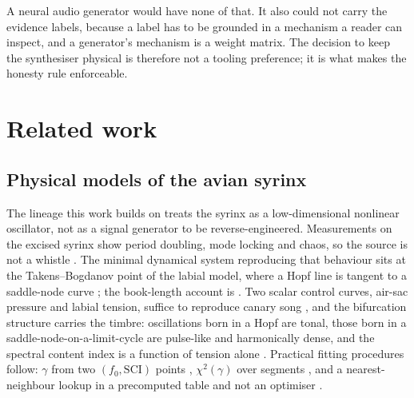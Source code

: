 \documentclass[10pt,twocolumn,a4paper]{article}
\begin{document}
A neural audio generator would have none of that. It also could not carry the evidence
labels, because a label has to be grounded in a mechanism a reader can inspect, and a
generator's mechanism is a weight matrix. The decision to keep the synthesiser physical is
therefore not a tooling preference; it is what makes the honesty rule enforceable.

\section{Related work}
\label{sec:prior}

\subsection{Physical models of the avian syrinx}

The lineage this work builds on treats the syrinx as a low-dimensional nonlinear
oscillator, not as a signal generator to be reverse-engineered. Measurements on the
excised syrinx show period doubling, mode locking and chaos, so the source is not a
whistle \citep{fee1998}. The minimal dynamical system reproducing that behaviour sits at
the Takens--Bogdanov point of the labial model, where a Hopf line is tangent to a
saddle-node curve \citep{laje2002a,laje2002b}; the book-length account is
\citet{mindlin2005}. Two scalar control curves, air-sac pressure and labial tension,
suffice to reproduce canary song \citep{gardner2001}, and the bifurcation structure
carries the timbre: oscillations born in a Hopf are tonal, those born in a
saddle-node-on-a-limit-cycle are pulse-like and harmonically dense, and the spectral
content index is a function of tension alone \citep{sitt2008,amador2008}. Practical fitting
procedures follow: $\gamma$ from two $(f_0, \mathrm{SCI})$ points \citep{sitt2010},
$\chi^2(\gamma)$ over segments \citep{perl2011}, and a nearest-neighbour lookup in a
precomputed table and not an optimiser \citep{boari2015}.
\end{document}
